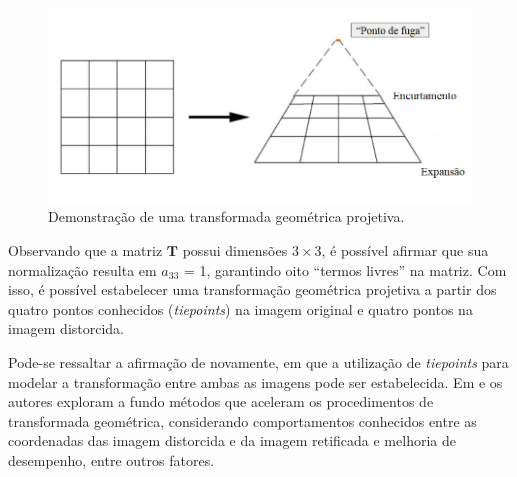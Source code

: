 \begin{figure}[htb]
    \caption{Demonstração de uma transformada geométrica projetiva.}
    \centering
    \begin{minipage}{.9\textwidth}
        \centering
        \includegraphics[width=\textwidth]{TCC/Imagens/transform.jpg}
	\end{minipage}
    \label{fig:projective_transf}
\end{figure}





Observando que a matriz $\mathbf{T}$ possui dimensões $3\times3$, é possível afirmar que sua normalização resulta em $a_{33}$ = 1, garantindo oito ``termos livres'' na matriz. Com isso, é possível estabelecer uma transformação geométrica projetiva a partir dos quatro pontos conhecidos (\textit{tiepoints}) na imagem original e quatro pontos na imagem distorcida.

Pode-se ressaltar a afirmação de \cite{Gonzales:2000} novamente, em que a utilização de \textit{tiepoints} para modelar a transformação entre ambas as imagens pode ser estabelecida. Em \cite{Wolberg:1990} e \cite{Heckbert:1989} os autores exploram a fundo métodos que aceleram os procedimentos de transformada geométrica, considerando comportamentos conhecidos entre as coordenadas das imagem distorcida e da imagem retificada e melhoria de desempenho, entre outros fatores.

